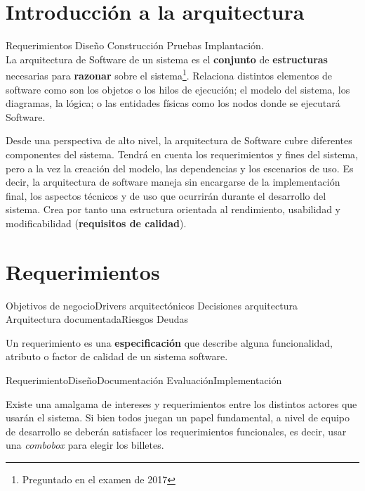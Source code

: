 \section{Introducción a la arquitectura}
\label{sec:arquitectura:intro}

Requerimientos \textrightarrow Diseño \textrightarrow Construcción
\textrightarrow Pruebas \textrightarrow Implantación.
\\

La arquitectura de Software de un sistema es el \textbf{conjunto} de
\textbf{estructuras} necesarias para \textbf{razonar} sobre el
sistema\footnote{Preguntado en el examen de 2017}. Relaciona distintos
elementos de software como son los objetos o los hilos de ejecución;
el modelo del sistema, los diagramas, la lógica; o las entidades
físicas como los nodos donde se ejecutará Software.

Desde una perspectiva de alto nivel, la arquitectura de Software cubre
diferentes componentes del sistema. Tendrá en cuenta los
requerimientos y fines del sistema, pero a la vez la creación del
modelo, las dependencias y los escenarios de uso. Es decir, la
arquitectura de software maneja sin encargarse de la implementación
final, los aspectos técnicos y de uso que ocurrirán durante el
desarrollo del sistema. Crea por tanto una estructura orientada al
rendimiento, usabilidad y modificabilidad (\textbf{requisitos de calidad}).

\section{Requerimientos}
\label{sec:arquitectura:requerimientos}

Objetivos de negocio\textrightarrow Drivers arquitectónicos
\textrightarrow Decisiones arquitectura\textrightarrow\\ Arquitectura
documentada\textrightarrow Riesgos Deudas
\\\par
Un requerimiento es una \textbf{especificación} que describe alguna
funcionalidad, atributo o factor de calidad de un sistema software.
\\\par
Requerimiento\textrightarrow Diseño\textrightarrow Documentación
\textrightarrow Evaluación\textrightarrow Implementación

Existe una amalgama de intereses y requerimientos entre los distintos
actores que usarán el sistema. Si bien todos juegan un papel
fundamental, a nivel de equipo de desarrollo se deberán satisfacer los
requerimientos funcionales, es decir, usar una \emph{combobox} para
elegir los billetes.\cite[p.~14]{IS1ArquitecturaDia1}

